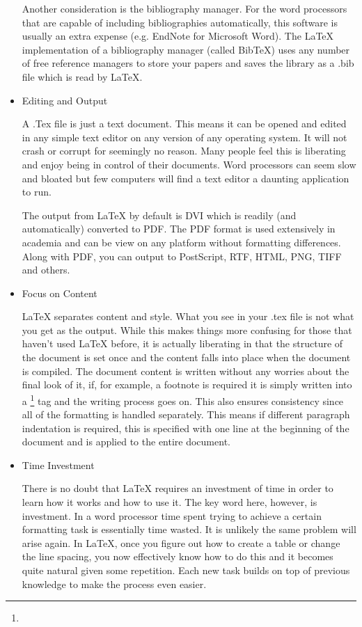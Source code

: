 \documentclass[12pt,letterpaper]{report}
\begin{document}
\begin{itemize}
Another consideration is the bibliography manager. For the word processors that are capable of including bibliographies automatically, this software is usually an extra expense (e.g. EndNote for Microsoft Word). The LaTeX implementation of a bibliography manager (called BibTeX) uses any number of free reference managers to store your papers and saves the library as a .bib file which is read by LaTeX.

\item Editing and Output

A .Tex file is just a text document. This means it can be opened and edited in any simple text editor on any version of any operating system. It will not crash or corrupt for seemingly no reason. Many people feel this is liberating and enjoy being in control of their documents. Word processors can seem slow and bloated but few computers will find a text editor a daunting application to run.

The output from LaTeX by default is DVI which is readily (and automatically) converted to PDF. The PDF format is used extensively in academia and can be view on any platform without formatting differences. Along with PDF, you can output to PostScript, RTF, HTML, PNG, TIFF and others.

\item Focus on Content

LaTeX separates content and style. What you see in your .tex file is not what you get as the output. While this makes things more confusing for those that haven't used LaTeX before, it is actually liberating in that the structure of the document is set once and the content falls into place when the document is compiled. The document content is written without any worries about the final look of it, if, for example, a footnote is required it is simply written into a \footnote{} tag and the writing process goes on. This also ensures consistency since all of the formatting is handled separately. This means if different paragraph indentation is required, this is specified with one line at the beginning of the document and is applied to the entire document.

\item Time Investment

There is no doubt that LaTeX requires an investment of time in order to learn how it works and how to use it. The key word here, however, is investment. In a word processor time spent trying to achieve a certain formatting task is essentially time wasted. It is unlikely the same problem will arise again. In LaTeX, once you figure out how to create a table or change the line spacing, you now effectively know how to do this and it becomes quite natural given some repetition. Each new task builds on top of previous knowledge to make the process even easier.


\end{itemize}
\end{document}
